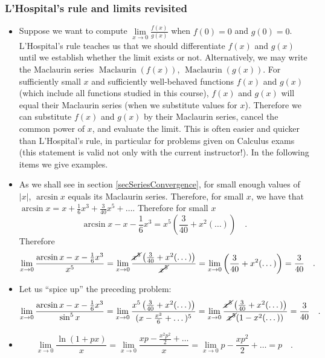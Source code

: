 \documentclass[12pt]{book}
\DeclareMathOperator{\maclaurin}{Maclaurin}
\begin{document}
\subsubsection{L'Hospital's rule and limits revisited}\label{secLHospitalRevisited}
\begin{itemize}
\item Suppose we want to compute $\lim\limits_{x\to 0} \frac{f(x)}{g(x)}$ when $f(0)= 0$ and $g(0)=0$. 
L'Hospital's rule teaches us that we should differentiate $f(x)$ and $g(x)$ until we establish whether the limit exists or not. Alternatively, we may write the Maclaurin series $\maclaurin (f(x))$, $\maclaurin (g(x))$. For sufficiently small $x$ and sufficiently well-behaved functions $f(x)$ and $g(x)$ (which include all functions studied in this course), $f(x)$ and $g(x)$ will equal their Maclaurin series (when we substitute values for $x$). Therefore we can substitute $f(x)$ and $g(x)$ by their Maclaurin series, cancel the common power of $x$, and evaluate the limit. This is often easier and quicker than L'Hospital's rule, in particular for problems given on Calculus exams (this statement is valid not only with the current instructor!). In the following items we give examples. 
\item As we shall see in section \ref{secSeriesConvergence}, for small enough values of $|x|$, $\arcsin x$ equals its Maclaurin series. Therefore, for small $x$, we have that $\arcsin x = x+\frac{1}6x^3 + \frac{3}{40}x^5+\dots $. Therefore for small $x$
\[
\arcsin x- x- \frac{1}6x^3= x^5 \left(\frac{3}{40}+x^2(\dots)\right)\quad .
\] Therefore 
\[
\lim\limits_{x\to 0} \frac{\arcsin x- x- \frac{1}6x^3}{x^5}= \lim\limits_{x\to 0} \frac{ \cancel{x^5} \left(\frac{3}{40}+x^2(\dots)\right)}{\cancel{x^5}} =  \lim\limits_{x\to 0}  \left(\frac{3}{40}+x^2(\dots)\right) =\frac{3}{40}\quad .
\]
\item Let us ``spice up'' the preceding problem:
\[
\lim\limits_{x\to 0} \frac{\arcsin x- x- \frac{1}6x^3}{\sin^{5} x}= \lim\limits_{x\to 0} \frac{x^5 \left(\frac{3}{40}+x^2(\dots)\right)}{(x-\frac{x^3}6+\dots)^5}=  \lim\limits_{x\to 0} \frac{\cancel{x^5} \left(\frac{3}{40}+x^2(\dots)\right)}{\cancel{x^5}(1-x^2(\dots))}= \frac{3}{40}\quad .
\]
\item 
\begin{equation}\label{eqLhospitalExample1}
\lim\limits_{x\to 0}\frac{\ln(1+px)}{x}=\lim \limits_{x\to 0} \frac{xp- \frac{x^2p^2}{2}+\dots  }{x}= \lim \limits_{x\to 0} p- \frac{xp^2}{2}+\dots = p\quad .
\end{equation}

\end{itemize}
\end{document}
